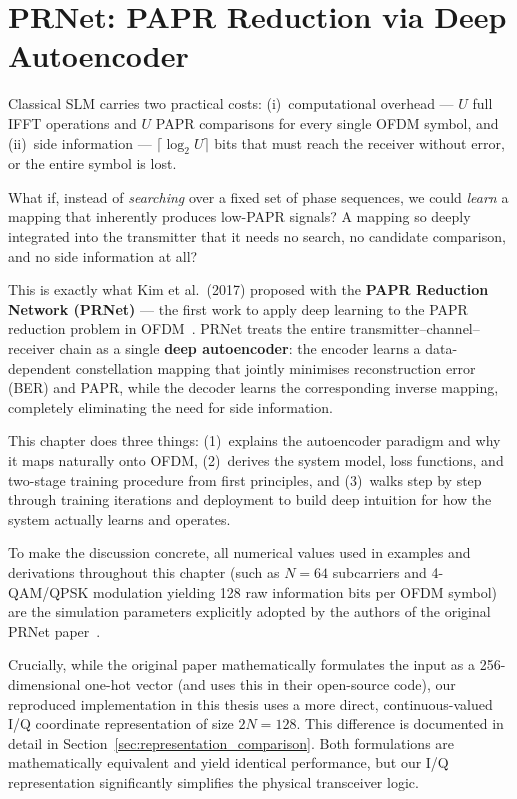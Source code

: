 \chapter{PRNet: PAPR Reduction via Deep Autoencoder}
\label{ch:prnet}

\begin{motivation}
    Classical SLM carries two practical costs: (i)~computational overhead --- $U$ full IFFT operations and $U$ PAPR comparisons for every single OFDM symbol, and (ii)~side information --- $\lceil\log_2 U\rceil$ bits that must reach the receiver without error, or the entire symbol is lost.

    What if, instead of \emph{searching} over a fixed set of phase sequences, we could \emph{learn} a mapping that inherently produces low-PAPR signals? A mapping so deeply integrated into the transmitter that it needs no search, no candidate comparison, and no side information at all?

    This is exactly what Kim et al.\ (2017) proposed with the \textbf{PAPR Reduction Network (PRNet)} --- the first work to apply deep learning to the PAPR reduction problem in OFDM~\cite{kim2017novel}.  PRNet treats the entire transmitter--channel--receiver chain as a single \textbf{deep autoencoder}: the encoder learns a data-dependent constellation mapping that jointly minimises reconstruction error (BER) and PAPR, while the decoder learns the corresponding inverse mapping, completely eliminating the need for side information.

    This chapter does three things: (1)~explains the autoencoder paradigm and why it maps naturally onto OFDM, (2)~derives the system model, loss functions, and two-stage training procedure from first principles, and (3)~walks step by step through training iterations and deployment to build deep intuition for how the system actually learns and operates.
\end{motivation}

\begin{keyinsight}
    To make the discussion concrete, all numerical values used in examples and derivations throughout this chapter (such as $N = 64$ subcarriers and 4-QAM/QPSK modulation yielding 128 raw information bits per OFDM symbol) are the simulation parameters explicitly adopted by the authors of the original PRNet paper~\cite{kim2017novel}.

    Crucially, while the original paper mathematically formulates the input as a 256-dimensional one-hot vector (and uses this in their open-source code), our reproduced implementation in this thesis uses a more direct, continuous-valued I/Q coordinate representation of size $2N = 128$. This difference is documented in detail in Section~\ref{sec:representation_comparison}. Both formulations are mathematically equivalent and yield identical performance, but our I/Q representation significantly simplifies the physical transceiver logic.
\end{keyinsight}


